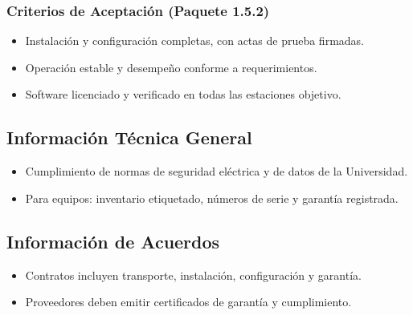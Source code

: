 \subsubsection*{Criterios de Aceptación (Paquete 1.5.2)}
\begin{itemize}
    \item Instalación y configuración completas, con actas de prueba firmadas.
    \item Operación estable y desempeño conforme a requerimientos.
    \item Software licenciado y verificado en todas las estaciones objetivo.
\end{itemize}

\subsection{Información Técnica General}
\begin{itemize}
    \item Cumplimiento de normas de seguridad eléctrica y de datos de la Universidad.
    \item Para equipos: inventario etiquetado, números de serie y garantía registrada.
\end{itemize}

\subsection{Información de Acuerdos}
\begin{itemize}
    \item Contratos incluyen transporte, instalación, configuración y garantía.
    \item Proveedores deben emitir certificados de garantía y cumplimiento.
\end{itemize}
